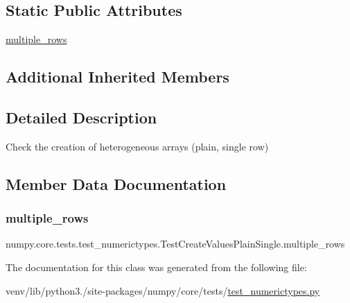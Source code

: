 \subsection*{Static Public Attributes}
\begin{DoxyCompactItemize}
\item 
\hyperlink{classnumpy_1_1core_1_1tests_1_1test__numerictypes_1_1TestCreateValuesPlainSingle_a57d5f13ce79260d9fe0ff801bc4e8f2b}{multiple\+\_\+rows}
\end{DoxyCompactItemize}
\subsection*{Additional Inherited Members}


\subsection{Detailed Description}
\begin{DoxyVerb}Check the creation of heterogeneous arrays (plain, single row)\end{DoxyVerb}
 

\subsection{Member Data Documentation}
\mbox{\label{classnumpy_1_1core_1_1tests_1_1test__numerictypes_1_1TestCreateValuesPlainSingle_a57d5f13ce79260d9fe0ff801bc4e8f2b}} 
\subsubsection{\texorpdfstring{multiple\+\_\+rows}{multiple\_rows}}
{\footnotesize\ttfamily numpy.\+core.\+tests.\+test\+\_\+numerictypes.\+Test\+Create\+Values\+Plain\+Single.\+multiple\+\_\+rows\hspace{0.3cm}{\ttfamily [static]}}



The documentation for this class was generated from the following file\+:\begin{DoxyCompactItemize}
\item 
venv/lib/python3./site-\/packages/numpy/core/tests/\hyperlink{test__numerictypes_8py}{test\+\_\+numerictypes.\+py}\end{DoxyCompactItemize}
